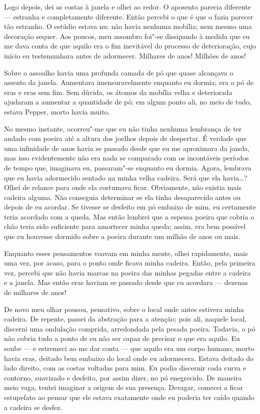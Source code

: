 Logo depois, dei as costas à janela e olhei ao redor. O aposento parecia diferente --- estranha e completamente
diferente. Então percebi o que é que o fazia parecer tão estranho. O estúdio estava nu: não havia nenhuma mobília;
nem mesmo uma decoração sequer. Aos poucos, meu assombro foi"-se dissipando à medida que eu me dava conta
de que aquilo era o fim inevitável do processo de deterioração, cujo início eu testemunhara antes de adormecer.
Milhares de anos! Milhões de anos!

Sobre o assoalho havia uma profunda camada de pó que quase alcançava o assento da janela. Aumentara imensuravelmente
enquanto eu dormia; era o pó de eras e eras sem fim. Sem dúvida, os átomos da mobília velha e deteriorada ajudaram a
aumentar a quantidade de pó; em algum ponto ali, no meio de tudo, estava Pepper, morto havia muito.

No mesmo instante, ocorreu"-me que eu não tinha nenhuma lembrança de ter andado com poeira até a altura dos joelhos
depois de despertar. É verdade que uma infinidade de anos havia se passado desde que eu me aproximara da janela, mas
isso evidentemente não era nada se comparado com os incontáveis períodos de tempo que, imaginava eu, passaram"-se
enquanto eu dormia. Agora, lembrava que eu havia adormecido sentado na minha velha cadeira. Será que ela havia\ldots{}?
Olhei de relance para onde ela costumava ficar. Obviamente, não existia mais cadeira alguma. Não conseguia determinar se
ela tinha desaparecido antes ou depois de eu acordar. Se tivesse se desfeito em pó embaixo de mim, eu certamente teria
acordado com a queda. Mas então lembrei que a espessa poeira que cobria o chão teria sido suficiente para amortecer
minha queda; assim, era bem possível que eu houvesse dormido sobre a poeira durante um milhão de anos ou mais.

Enquanto esses pensamentos voavam em minha mente, olhei rapidamente, mais uma vez, por acaso, para o ponto onde ficava
minha cadeira. Então, pela primeira vez, percebi que não havia marcas na poeira das minhas pegadas entre a cadeira e
a janela. Mas então eras haviam se passado desde que eu acordara --- dezenas de milhares de anos!

De novo meu olhar pousou, pensativo, sobre o local onde antes estivera minha cadeira. De repente, passei da
abstração para a atenção; pois ali, naquele local, discerni uma ondulação comprida, arredondada pela pesada poeira.
Todavia, o pó não cobria tudo a ponto de eu não ser capaz de precisar o que era aquilo. Eu soube --- e estremeci ao me dar conta
--- que aquilo era um corpo humano, morto havia eras, deitado bem embaixo do local onde eu adormecera. Estava deitado do
lado direito, com as costas voltadas para mim. Eu podia discernir cada curva e contorno, suavizado e desfeito, por
assim dizer, no pó enegrecido. De maneira meio vaga, tentei imaginar a origem de sua presença. Devagar, comecei a
ficar estupefato ao pensar que ele estava exatamente onde eu poderia ter caído quando a cadeira se desfez.

